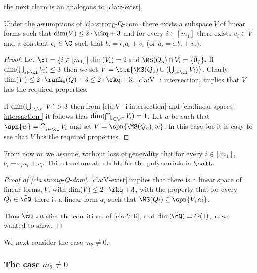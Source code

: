 the next claim is an analogous to \autoref{cla:z-exist}.


\begin{claim}\label{cla:V-exist}
Under the assumptions of \autoref{cla:strong-Q-dom} there exists a subspace $V$ of linear forms such that $\dim(V)\leq 2\cdot\rkq+ 3$ and  for every $i \in [m_1]$ there exists $v_i\in V$ and a constant $\epsilon_i\in\C$ such that $b_i = \epsilon_i a_i +v_i$ (or $a_i = \epsilon_i b_i +v_i$).
\end{claim}

\begin{proof}



Let $\cI=\{i\in[m_1] \mid \dim(V_i)=2 \text{ and } \MS(Q_o)\cap V_i = \{\vec{0}\} \}$. 
If $\dim(\bigcup_{i\in \cI} V_i) \leq 3$ then we set $V = \spn{\MS(Q_o)  \cup (\bigcup_{i\in \cI} V_i)}$. Clearly $\dim(V)\leq 2\cdot \rank_s(Q)+3\leq 2\cdot \rkq+3$.  \autoref{cla:V_i intersection}  implies that $V$ has the required properties. 

If $\dim(\bigcup_{i\in \cI} V_i) > 3$ then from \autoref{cla:V_i intersection} and \autoref{cla:linear-spaces-intersaction }
it follows that $\dim(\bigcap_{i\in \cI} V_i) =1$.
Let $w$ be such that $\spn{w}=\bigcap_{i\in \cI} V_i$ and set $V = \spn{\MS(Q_o),w}$. 
In this case too it is easy to see  that $V$ has the required properties.

\end{proof}







From now on we assume, without loss of generality that for every $i\in [m_1]$, $b_i = \epsilon_i a_i +v_i$. This structure also holds for the polynomials in $\calL$.

\begin{proof}[Proof of \autoref{cla:strong-Q-dom}]
	\autoref{cla:V-exist} implies that there is a linear space of linear forms, $V$, with $\dim(V) \leq 2\cdot\rkq+ 3$, with the property that for every $Q_i \in \tilde{\cQ}$  there is a linear form $a_i$ such that $\MS(Q_i) \subseteq \spn{V,a_i}$. 
	
	Thus $\tilde{\cQ}$ satisfies the conditions of \autoref{cla:V-li}, and $\dim(\tilde{\cQ}) = O(1)$, as we wanted to show.
\end{proof}

We next consider the case $m_2\neq 0$.

\subsubsection{The case $m_2\neq 0$}

